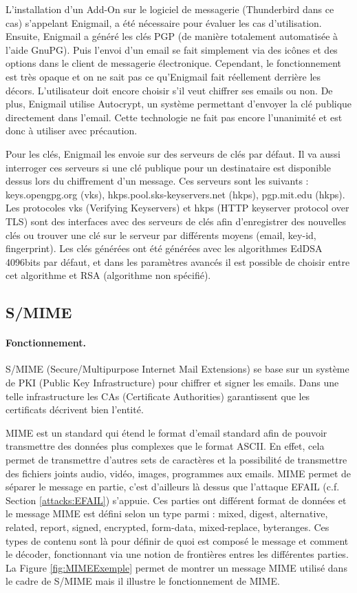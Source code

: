 L'installation d'un Add-On sur le logiciel de messagerie (Thunderbird dans ce cas) s’appelant Enigmail, a été nécessaire pour évaluer les cas d'utilisation. Ensuite, Enigmail a généré les clés PGP (de manière totalement automatisée à l'aide GnuPG). Puis l'envoi d'un email se fait simplement via des icônes et des options dans le client de messagerie électronique. Cependant, le fonctionnement est très opaque et on ne sait pas ce qu'Enigmail fait réellement derrière les décors. L’utilisateur doit encore choisir s’il veut chiffrer ses emails ou non. De plus, Enigmail utilise Autocrypt, un système permettant d'envoyer la clé publique directement dans l'email. Cette technologie ne fait pas encore l'unanimité et est donc à utiliser avec précaution.
 
Pour les clés, Enigmail les envoie sur des serveurs de clés par défaut. Il va aussi interroger ces serveurs si une clé publique pour un destinataire est disponible dessus lors du chiffrement d'un message. Ces serveurs sont les suivants : keys.opengpg.org (vks), hkps.pool.sks-keyservers.net (hkps), pgp.mit.edu (hkps). Les protocoles vks (Verifying Keyservers) et hkps (HTTP keyserver protocol over TLS) sont des interfaces avec des serveurs de clés afin d'enregistrer des nouvelles clés ou trouver une clé sur le serveur par différents moyens (email, key-id, fingerprint). Les clés générées ont été générées avec les algorithmes EdDSA 4096bits par défaut, et dans les paramètres avancés il est possible de choisir entre cet algorithme et RSA (algorithme non spécifié).
\subsection{S/MIME}
\label{protocols:SMIME}
\paragraph*{Fonctionnement.}
S/MIME (Secure/Multipurpose Internet Mail Extensions) se base sur un système de PKI (Public Key Infrastructure) pour chiffrer et signer les emails. Dans une telle infrastructure les CAs (Certificate Authorities) garantissent que les certificats décrivent bien l'entité.

MIME est un standard qui étend le format d'email standard afin de pouvoir transmettre des données plus complexes que le format ASCII. En effet, cela permet de transmettre d'autres sets de caractères et la possibilité de transmettre des fichiers joints audio, vidéo, images, programmes aux emails. MIME permet de séparer le message en partie, c'est d'ailleurs là dessus que l'attaque EFAIL (c.f. Section \ref{attacks:EFAIL}) s'appuie. Ces parties ont différent format de données et le message MIME est défini selon un type parmi : mixed, digest, alternative, related, report, signed, encrypted, form-data, mixed-replace, byteranges. Ces types de contenu sont là pour définir de quoi est composé le message et comment le décoder, fonctionnant via une notion de frontières entres les différentes parties. La Figure \ref{fig:MIMEExemple} permet de montrer un message MIME utilisé dans le cadre de S/MIME mais il illustre le fonctionnement de MIME.


